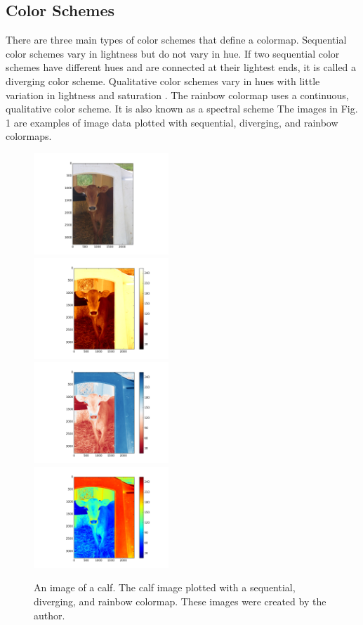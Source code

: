 \documentclass[journal,12pt]{IEEEtran}
\begin{document}
\subsection{Color Schemes}

There are three main types of color schemes that define a colormap.
Sequential color schemes vary in lightness but do not
vary in hue. If two sequential color schemes have different hues and are
connected at their lightest ends, it is called a diverging color scheme. Qualitative color
schemes vary in hues with little variation in lightness
and saturation \cite{colormapping}. The rainbow colormap uses a continuous,
qualitative color scheme. It is also known as a spectral scheme \cite{spectralschemes}
The images in Fig. 1
are examples of image data plotted with 
sequential, diverging, and rainbow colormaps.

\begin{figure}
\centering
\includegraphics[width=2in]{calf_original} \\
\includegraphics[width=2in]{calf_sequential} \\
\includegraphics[width=2in]{calf_diverging} \\
\includegraphics[width=2in]{calf_rainbow} \\
\caption{An image of a calf. The calf image plotted with a
sequential, diverging, and rainbow colormap. These images were created by the author.}
\end{figure}
\end{document}
